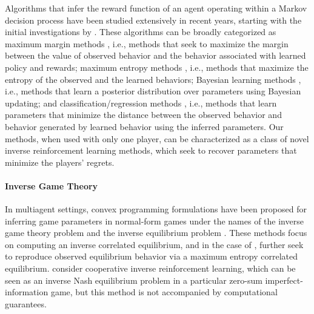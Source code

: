 Algorithms that infer the reward function of an agent operating within a Markov decision process \cite{bellman1952theory} have been studied extensively in recent years, starting with the initial investigations by \citet{ng2000algorithms}.
These algorithms can be broadly categorized as maximum margin methods \cite{ratliff2006maximum, silver2008high, abbeel2004apprenticeship, syed2007game}, i.e., methods that seek to maximize the margin between the value of observed behavior and the behavior associated with learned policy and rewards;
maximum entropy methods \cite{ziebart2008maximum, wulfmeier2015maximum, ziebart2008maximum,theodorou2010generalized, boularias2012structured, boularias2011relative}, i.e., methods that maximize the entropy of the observed and the learned behaviors;
Bayesian learning methods \cite{ramachandran2007bayesian, choi2011map,lopes2009active,levine2011nonlinear,babes2011apprenticeship}, i.e., methods that learn a posterior distribution over parameters using Bayesian updating;
and classification/regression methods \cite{klein2012inverse,taskar2005learning,klein2013cascaded,brown2019extrapolating}, i.e., methods that learn parameters that minimize the distance between the observed behavior and behavior generated by learned behavior using the inferred parameters.
Our methods, when used with only one player, can be characterized as a class of novel  inverse reinforcement learning methods, which seek to recover parameters that minimize the players' regrets.


\paragraph{Inverse Game Theory}

In multiagent settings, convex programming formulations have been proposed for inferring game parameters   in normal-form games under the names of the inverse game theory problem \cite{kuleshov2015inverse} and the inverse equilibrium problem \cite{waugh2013computational, bestick2013inverse}.
These methods focus on computing an inverse correlated equilibrium, and in the case of \citeauthor{waugh2013computational}, further seek to reproduce observed equilibrium behavior via a maximum entropy correlated equilibrium.
\citeauthor{hadfield2016cooperative} \citeyear{hadfield2016cooperative} consider cooperative inverse reinforcement learning, which can be seen as an inverse Nash equilibrium problem in a particular zero-sum imperfect-information game, but this method is not accompanied by computational guarantees.

